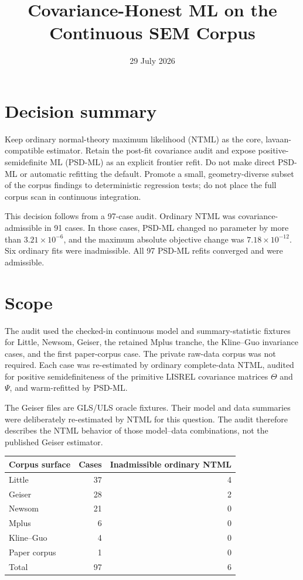 \documentclass[11pt]{article}
\title{Covariance-Honest ML on the Continuous SEM Corpus}
\author{}
\date{29 July 2026}
\begin{document}
\maketitle

\section*{Decision summary}

Keep ordinary normal-theory maximum likelihood (NTML) as the core,
lavaan-compatible estimator.  Retain the post-fit covariance audit and expose
positive-semidefinite ML (PSD-ML) as an explicit frontier refit.  Do not make
direct PSD-ML or automatic refitting the default.  Promote a small,
geometry-diverse subset of the corpus findings to deterministic regression
tests; do not place the full corpus scan in continuous integration.

This decision follows from a 97-case audit.  Ordinary NTML was
covariance-admissible in 91 cases.  In those cases, PSD-ML changed no parameter
by more than \(3.21\times 10^{-6}\), and the maximum absolute objective change
was \(7.18\times 10^{-12}\).  Six ordinary fits were inadmissible.  All 97
PSD-ML refits converged and were admissible.

\section*{Scope}

The audit used the checked-in continuous model and summary-statistic fixtures
for Little, Newsom, Geiser, the retained Mplus tranche, the Kline--Guo
invariance cases, and the first paper-corpus case.  The private raw-data corpus
was not required.  Each case was re-estimated by ordinary complete-data NTML,
audited for positive semidefiniteness of the primitive LISREL covariance
matrices \(\Theta\) and \(\Psi\), and warm-refitted by PSD-ML.

The Geiser files are GLS/ULS oracle fixtures.  Their model and data summaries
were deliberately re-estimated by NTML for this question.  The audit therefore
describes the NTML behavior of those model--data combinations, not the
published Geiser estimator.

\begin{center}
\begin{tabular}{lrr}
\toprule
Corpus surface & Cases & Inadmissible ordinary NTML \\
\midrule
Little       & 37 & 4 \\
Geiser       & 28 & 2 \\
Newsom       & 21 & 0 \\
Mplus        &  6 & 0 \\
Kline--Guo   &  4 & 0 \\
Paper corpus &  1 & 0 \\
\midrule
Total        & 97 & 6 \\
\bottomrule
\end{tabular}
\end{center}
\end{document}
